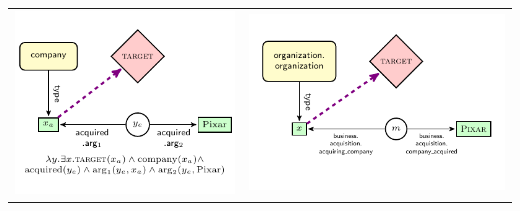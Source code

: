\documentclass{article}
\begin{document}
 
\begin{tabular}{cc} 
  \includegraphics[scale=0.9]{transitive_ungrounded} &  \includegraphics[scale=1]{transitive_grounded} \\
\end{tabular} 
\end{document}
